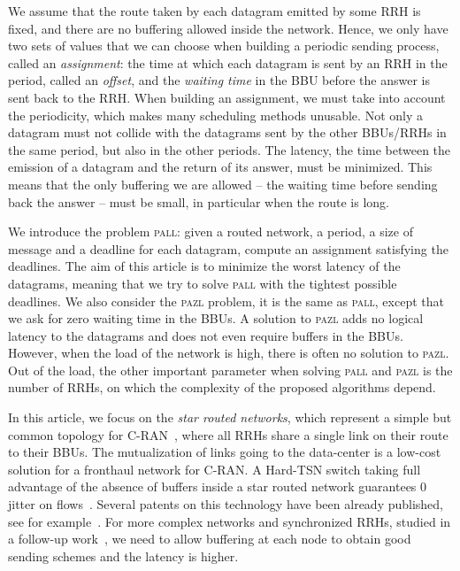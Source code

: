 \documentclass[a4paper,10pt]{journal}
\newcommand\pazl{\textsc{pazl}\xspace}
\newcommand\pall{\textsc{pall}\xspace}
\begin{document}
We assume that the route taken by each datagram emitted by some RRH is fixed, and there are no buffering allowed inside the network. Hence, we only have two sets of values that we can choose when building a periodic sending process, called an \emph{assignment}: the time at which each datagram is sent by an RRH in the period, called an \emph{offset}, and the \emph{waiting time} in the BBU before the answer is sent back to the RRH. 
When building an assignment, we must take into account the periodicity, which makes many scheduling methods unusable. Not only a datagram must not collide with the datagrams sent by the other BBUs/RRHs in the same period, but also in the other periods. The latency, the time between the emission of a datagram and the return of its answer, must be minimized. This means that the only buffering we are allowed -- the waiting time before sending back the answer -- must be small, in particular when the route is long.

We introduce the problem \pall: given a routed network, a period, a size of message and a deadline for each datagram, compute an assignment
satisfying the deadlines. The aim of this article is to minimize the worst latency of the datagrams, meaning that we try to solve \pall with the tightest possible deadlines.
We also consider the \pazl problem, it is the same as \pall, except that we ask for zero waiting time in the BBUs. A solution to \pazl 
adds no logical latency to the datagrams and does not even require buffers in the BBUs. However, when the load of the network is high, there is often no solution
to \pazl. Out of the load, the other important parameter when solving \pall and \pazl is the number of RRHs, on which the complexity of the proposed algorithms depend. 

In this article, we focus on the \emph{star routed networks}, which represent a simple but common topology for C-RAN~\cite{electronics9122131,bhattacharjee2020time},
where all RRHs share a single link on their route to their BBUs. The mutualization of links going to the data-center is a low-cost solution for a fronthaul network for C-RAN.  
A Hard-TSN switch taking full advantage of the absence of buffers inside a star routed network guarantees $0$ jitter on flows~\cite{Marc2201:Experimental}. Several patents on this technology have been already published, see for example~\cite{howe2005time,leclerc2016transmission}. For more complex networks and synchronized RRHs, studied in a follow-up work~\cite{guiraud2021deterministic}, we need to allow buffering at each node to obtain good sending schemes and the latency is higher.
\end{document}
